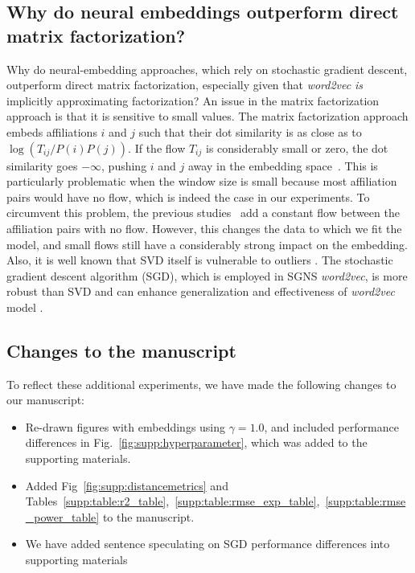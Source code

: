 \documentclass[12pt,a4paper]{article}
\begin{document}
\subsection{Why do neural embeddings outperform direct matrix factorization?}
Why do neural-embedding approaches, which rely on stochastic gradient descent, outperform direct matrix factorization, especially given that \textit{word2vec} \emph{is} implicitly approximating factorization?
An issue in the matrix factorization approach is that it is sensitive to small values. The matrix factorization approach embeds affiliations $i$ and $j$ such that their dot similarity is as close as to $\log (T_{ij} / P(i) P(j))$. If the flow $T_{ij}$ is considerably small or zero, the dot similarity goes $-\infty$, pushing $i$ and $j$ away in the embedding space~\autocite{levy2014neural, Qui2018}. This is particularly problematic when the window size is small because most affiliation pairs would have no flow, which is indeed the case in our experiments. To circumvent this problem, the previous studies~\autocite{levy2014neural, Qui2018} add a constant flow between the affiliation pairs with no flow. However, this changes the data to which we fit the model, and small flows still have a considerably strong impact on the embedding. Also, it is well known that SVD itself is vulnerable to outliers \autocite{xu2012robust, huber1981robust, xu1995robust, chandrasekaran2011rank, candes2011robust}.
The stochastic gradient descent algorithm (SGD), which is employed in SGNS \textit{word2vec}, is more robust than SVD and can enhance generalization and effectiveness of {\it word2vec} model \autocite{ma2018power, smith2020generalization, zhang2019algorithmic}.


\subsection{Changes to the manuscript}
To reflect these additional experiments, we have made the following changes to our manuscript:
\begin{itemize}
	\item Re-drawn figures with embeddings using $\gamma = 1.0$, and included performance differences in Fig.~\ref{fig:supp:hyperparameter}, which was added to the supporting materials. 
	\item Added Fig~\ref{fig:supp:distancemetrics} and Tables~\ref{supp:table:r2_table},~\ref{supp:table:rmse_exp_table},~\ref{supp:table:rmse_power_table} to the manuscript.
	\item We have added sentence speculating on SGD performance differences into supporting materials
\end{itemize}
\end{document}
